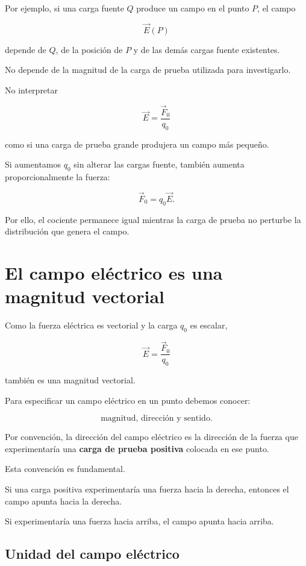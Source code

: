 Por ejemplo, si una carga fuente \(Q\) produce un campo en el punto \(P\), el campo

\[
\vec E(P)
\]

depende de \(Q\), de la posición de \(P\) y de las demás cargas fuente existentes.

No depende de la magnitud de la carga de prueba utilizada para investigarlo.

\begin{errorfrecuente}

No interpretar

\[
\vec E=\frac{\vec F_0}{q_0}
\]

como si una carga de prueba grande produjera un campo más pequeño.

Si aumentamos \(q_0\) sin alterar las cargas fuente, también aumenta
proporcionalmente la fuerza:

\[
\vec F_0=q_0\vec E.
\]

Por ello, el cociente permanece igual mientras la carga de prueba no perturbe la
distribución que genera el campo.

\end{errorfrecuente}


\section{El campo eléctrico es una magnitud vectorial}

Como la fuerza eléctrica es vectorial y la carga \(q_0\) es escalar,

\[
\vec E=\frac{\vec F_0}{q_0}
\]

también es una magnitud vectorial.

Para especificar un campo eléctrico en un punto debemos conocer:

\[
\boxed{\text{magnitud, dirección y sentido}}.
\]

Por convención, la dirección del campo eléctrico es la dirección de la fuerza que
experimentaría una \textbf{carga de prueba positiva} colocada en ese punto.

Esta convención es fundamental.

Si una carga positiva experimentaría una fuerza hacia la derecha, entonces el campo
apunta hacia la derecha.

Si experimentaría una fuerza hacia arriba, el campo apunta hacia arriba.


\subsection{Unidad del campo eléctrico}

